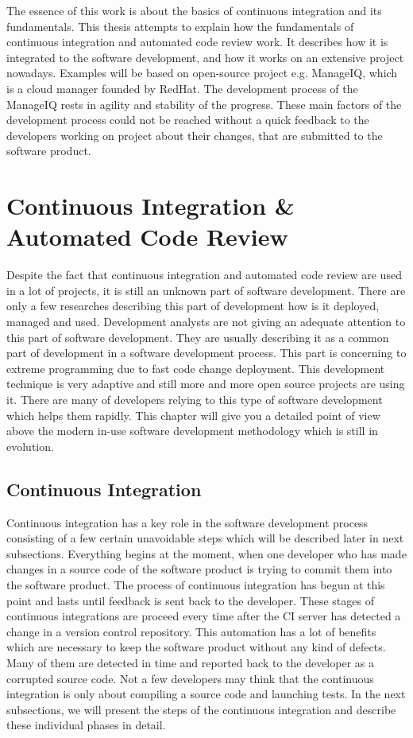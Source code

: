 The essence of this work is about the basics of continuous integration and its fundamentals. This thesis attempts to explain how the fundamentals of continuous integration and automated code review work. It describes how it is integrated to the software development, and how it works on an extensive project nowadays. Examples will be based on open-source project e.g. ManageIQ, which is a cloud manager founded by RedHat. The development process of the ManageIQ rests in agility and stability of the progress. These main factors of the development process could not be reached without a quick feedback to the developers working on project about their changes, that are submitted to the software product.

\chapter{Continuous Integration \& Automated Code Review}

Despite the fact that continuous integration and automated code review are used in a lot of projects, it is still an unknown part of software development. There are only a few researches describing this part of development how is it deployed, managed and used. Development analysts are not giving an adequate attention to this part of software development. They are usually describing it as a common part of development in a software development process. This part is concerning to extreme programming due to fast code change deployment. This development technique is very adaptive and still more and more open source projects are using it. There are many of developers relying to this type of software development which helps them rapidly. This chapter will give you a detailed point of view above the modern in-use software development methodology which is still in evolution.

\section{Continuous Integration}

Continuous integration has a key role in the software development process consisting of a few certain unavoidable steps which will be described later in next subsections. Everything begins at the moment, when one developer who has made changes in a source code of the software product is trying to commit them into the software product. The process of continuous integration has begun at this point and lasts until feedback is sent back to the developer. These stages of continuous integrations are proceed every time after the CI server has detected a change in a version control repository. This automation has a lot of benefits which are necessary to keep the software product without any kind of defects. Many of them are detected in time and reported back to the developer as a corrupted source code. Not a few developers may think that the continuous integration is only about compiling a source code and launching tests. In the next subsections, we will present the steps of the continuous integration and describe these individual phases in detail.\\

